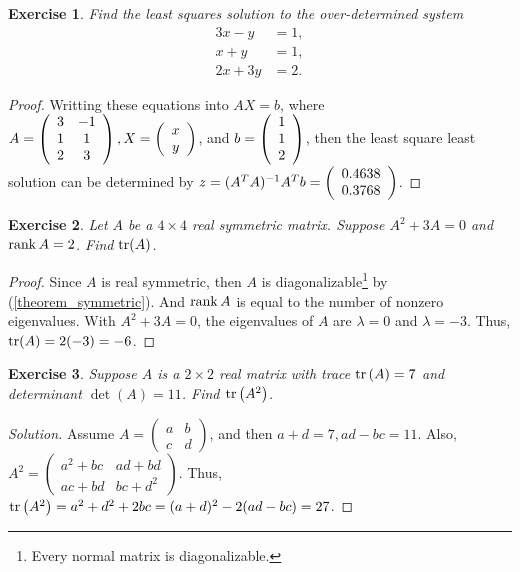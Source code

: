 \documentclass[11pt]{book}
\newtheorem{exercise}{Exercise}[section]
\theoremstyle{definition}
\numberwithin{equation}{chapter}
\begin{document}
\begin{exercise}
Find the least squares solution to the over-determined system%
\begin{align*}
3x-y  &  =1,\\
x+y  &  =1,\\
2x+3y  &  =2.
\end{align*}
\end{exercise}
\begin{proof}
Writting these equations into $AX=b$, where $A = \left(\begin{array}
    [c]{cc}%
    3 & -1\\
    1 & 1\\
    2 & 3
    \end{array}\right), X = \left(\begin{array}
    [c]{c}%
    x\\
    y\\
    \end{array}\right)$, and $b = \left(\begin{array}
    [c]{c}%
    1\\
    1\\
    2
    \end{array}\right)$, then the least square least solution can be determined by $z = (A^TA)^{-1}A^T b = \left(\begin{array}
    [c]{c}%
    0.4638\\
    0.3768\\
    \end{array}\right)
    $.
\end{proof}

\medskip

\begin{exercise}{\bf *}
Let $A$ be a $4 \times 4$ real symmetric matrix. Suppose $A^2 + 3A = 0$ and $\rank A = 2$. Find ${\rm tr}(A)$.
\end{exercise}
\begin{proof}
Since $A$ is real symmetric, then $A$ is diagonalizable\footnote{Every normal matrix is diagonalizable\cite{21}.} by (\ref{theorem_symmetric}). And $\rank A$ is equal to the number of nonzero eigenvalues. With $A^2 + 3A = 0$, the eigenvalues of $A$ are $\lambda = 0$ and $\lambda = -3$. Thus, ${\rm tr}(A) = 2(-3) = -6$.
\end{proof}

\medskip

\begin{exercise}\label{exer_trace}
Suppose $A$ is a $2 \times 2$ real matrix with trace ${\rm tr}\left(A \right) = 7$ and determinant $\det (A) = 11$. Find ${\rm tr}\left(A^2 \right)$.
\end{exercise}
\begin{proof}[Solution]
Assume $A = \begin{pmatrix} a & b \\ c & d \end{pmatrix}$, and then $a + d = 7, ad - bc = 11$. Also, $A^2 = \begin{pmatrix} a^2+bc &ad+bd \\ ac+bd & bc+d^2 \end{pmatrix}$. Thus, ${\rm tr}\left(A^2 \right) = a^2 + d^2 + 2bc = (a+d)^2 - 2(ad-bc) = 27$.
\end{proof}
\end{document}
